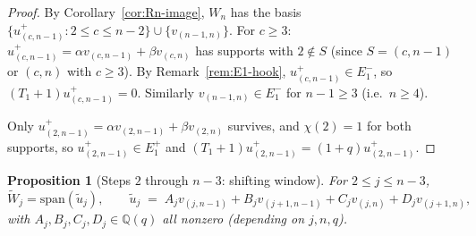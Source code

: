 \documentclass[11pt]{article}
\newtheorem{proposition}[theorem]{Proposition}
\theoremstyle{definition}
\begin{document}
\begin{proof}
By Corollary~\ref{cor:Rn-image}, $W_n$ has the basis
$\{u^+_{(c,n-1)} : 2\le c\le n-2\}\cup\{v_{(n-1,n)}\}$.  For $c\ge 3$:
$u^+_{(c,n-1)}=\alpha v_{(c,n-1)}+\beta v_{(c,n)}$ has supports with
$2\notin S$ (since $S=(c,n-1)$ or $(c,n)$ with $c\ge 3$).  By
Remark~\ref{rem:E1-hook}, $u^+_{(c,n-1)}\in E_1^-$, so
$(T_1{+}1)u^+_{(c,n-1)}=0$.  Similarly $v_{(n-1,n)}\in E_1^-$ for
$n-1\ge 3$ (i.e.\ $n\ge 4$).

Only $u^+_{(2,n-1)}=\alpha v_{(2,n-1)}+\beta v_{(2,n)}$ survives, and
$\chi(2)=1$ for both supports, so $u^+_{(2,n-1)}\in E_1^+$ and
$(T_1{+}1)u^+_{(2,n-1)}=(1{+}q)u^+_{(2,n-1)}$.
\end{proof}

\begin{proposition}[Steps $2$ through $n-3$: shifting window]\label{prop:shift}
For $2\le j\le n-3$,
\[
   \widetilde W_j = \mathrm{span}(\widetilde u_j),\qquad
   \widetilde u_j \;=\; A_j v_{(j,n-1)}+B_j v_{(j+1,n-1)}+C_j v_{(j,n)}+D_j v_{(j+1,n)},
\]
with $A_j,B_j,C_j,D_j\in\mathbb{Q}(q)$ all nonzero (depending on $j,n,q$).
\end{proposition}
\end{document}
